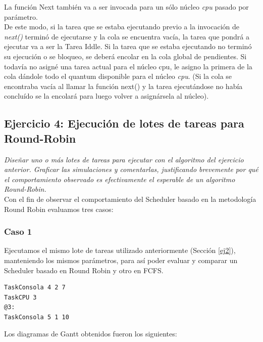 \documentclass[a4paper]{article}
\begin{document}
La funci\'on Next tambi\'en va a ser invocada para un s\'olo n\'ucleo \emph{cpu} pasado por par\'ametro.\\
De este modo, si la tarea que se estaba ejecutando previo a la invocaci\'on de \emph{next()} termin\'o de ejecutarse y la cola se encuentra vac\'ia, la tarea que pondr\'a a ejecutar va a ser la Tarea Iddle.
Si la tarea que se estaba ejecutando no termin\'o su ejecuci\'on o se bloqueo, se deber\'a encolar en la cola global de pendientes.
Si todav\'ia no asign\'e una tarea actual para el n\'ucleo cpu, le asigno la primera de la cola d\'andole todo el quantum disponible para el n\'ucleo \emph{cpu}. (Si la cola se encontraba vac\'ia al llamar la funci\'on next() y la tarea ejecut\'andose no hab\'ia conclu\'ido se la encolar\'a para luego volver a asign\'arsela al n\'ucleo).\\
 
\bigskip 
 
 
 \subsection{Ejercicio 4: Ejecuci\'on de lotes de tareas para Round-Robin}
 
\textit{Dise\~nar uno o m\'as lotes de tareas para ejecutar con el algoritmo del ejercicio anterior. Graficar las simulaciones y comentarlas, justificando brevemente por qu\'e el comportamiento observado es efectivamente el esperable de un algoritmo Round-Robin.}\\


Con el fin de observar el comportamiento del Scheduler basado en la metodolog\'ia Round Robin evaluamos tres casos:

\subsubsection*{Caso 1}

Ejecutamos el mismo lote de tareas utilizado anteriormente (Secci\'on \ref{ej2}), manteniendo los mismos par\'ametros, para as\'i poder evaluar y comparar un Scheduler basado en Round Robin y otro en FCFS. 

	\begin{codesnippet}
	\begin{verbatim}
TaskConsola 4 2 7
TaskCPU 3
@3:
TaskConsola 5 1 10
	\end{verbatim}
	\end{codesnippet}

Los diagramas de Gantt obtenidos fueron los siguientes:\\
\end{document}
